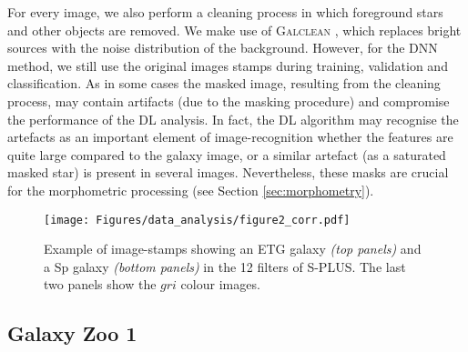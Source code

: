 \documentclass[fleqn,usenatbib]{mnras}
\begin{document}
For every image, we also perform a cleaning process in which foreground stars and other objects are removed.  We make use of \textsc{Galclean} \citep{Ferreira_Ferrari_Griffiths_2017,deAlbernaz2018}, which replaces bright sources with the noise distribution of the  background. However, for the DNN method, we still use the original images stamps during training, validation and classification. As in some cases the masked image, resulting from the cleaning process, may contain artifacts (due to the masking procedure) and compromise the performance of the DL analysis. In fact, the DL algorithm may recognise the artefacts as an important element of image-recognition whether the features are quite large compared to the galaxy image, or a similar artefact (as a saturated masked star) is present in several images. Nevertheless, these masks are crucial for the morphometric processing (see Section \ref{sec:morphometry}).






\begin{figure*}
\centering
\texttt{[image: Figures/data\_analysis/figure2\_corr.pdf]}
    \caption{
    \label{fig:example_grid_filters}
    Example of image-stamps showing an ETG galaxy {\it (top panels)} and a Sp galaxy {\it(bottom panels)} in the 12 filters of S-PLUS. The last two panels show the $gri$ colour images.\\
    }
\end{figure*}


\subsection{Galaxy Zoo 1}
\label{subsec:GZ1_training}
\label{sec:zoo}
\end{document}
